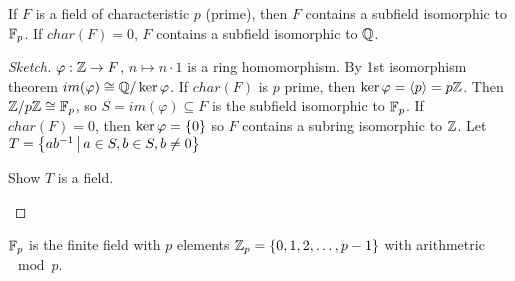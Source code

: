 \documentclass[]{article}
\begin{document}
\begin{theorem}
	[Steinitz 1910] If $F$ is a field of characteristic $p$ (prime), then $F$ contains a subfield isomorphic to $\mathbb{F}_p$. If $char(F)=0$, $F$ contains a subfield isomorphic to $\mathbb{Q}$.
\end{theorem}
\begin{proof}
	[Sketch] $\varphi:\mathbb{Z}\rightarrow F$, $n\mapsto n\cdot 1$ is a ring homomorphism.
	By 1st isomorphism theorem $im(\varphi)\cong\mathbb{Q}/\ker\varphi$.
	If $char(F)$ is $p$ prime, then $\ker\varphi=\left\langle p \right\rangle=p\mathbb{Z}$.
	Then $\mathbb{Z}/p\mathbb{Z}\cong\mathbb{F}_p$, so $S=im(\varphi)\subseteq F$ is the subfield isomorphic to $\mathbb{F}_p$.
	If $char(F)=0$, then $\ker\varphi=\left\{ 0 \right\}$ so $F$ contains a subring isomorphic to $\mathbb{Z}$.
	Let $T=\left\{ ab^{-1} \, \middle| \, a\in S,b\in S,b\neq0 \right\}$
	\begin{xca}
		Show $T$ is a field.
	\end{xca}
\end{proof}
\begin{remark}
	$\mathbb{F}_p$ is the finite field with $p$ elements $\mathbb{Z}_p=\left\{ 0,1,2,\dots,p-1 \right\}$ with arithmetric $\mod p$.
\end{remark}
\end{document}
